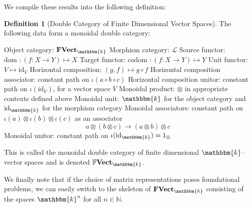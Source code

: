 \documentclass{amsart}
\newcommand{\N}{\mathbb{N}}
\newcommand{\C}{\mathbb{C}}
\newcommand{\K}{\mathbbm{k}}
\newcommand{\s}{\mathscr}
\newcommand{\tensor}{\otimes}
\renewcommand{\to}[1][]{\stackrel{#1}{\longrightarrow}}
\renewcommand{\mapsto}{\longmapsto}
\newcommand{\codom}{\text{codom }}
\newcommand{\dom}{\text{dom }}
\newcommand{\id}{\text{id}}
\newcommand{\FVect}{\textbf{FVect}}
\newcommand{\FFVect}{\mathbb{F}\textbf{Vect}}
\newcommand{\li}[1][]{\ifthenelse{\equal{#1}{}}{\item}{\item \label{#1}}}
\newenvironment{enmrt}{
  \enumerate[(i)]
  \setlength{\itemsep}{0pt}
}{
  \endenumerate
}
\numberwithin{thm}{section}
\theoremstyle{definition}
\newtheorem{defn}[thm]{Definition}
\begin{document}
We compile these results into the following definition:
\begin{defn}[Double Category of Finite Dimensional Vector Spaces]
The following data form a monoidal double category:
\begin{enmrt}
\li Object category: $\FVect_{\K}$
\li Morphism category: $\s{L}$
\li Source functor: $\dom : (f : X \to Y) \mapsto X$
\li Target functor: $\codom : (f : X \to Y) \mapsto Y$
\li Unit functor: $V \mapsto \id_V$
\li Horizontal composition: $(g, f) \mapsto g \circ f$
\li Horizontal composition associator: constant path on
$\iota(a \circ b \circ c)$
\li Horizontal composition unitor: constant path on $\iota(\id_V)$, for a vector
space $V$
\li Monoidal product: $\tensor$ in appropriate contexts defined above
\li Monoidal unit: $\K$ for the object category and $\id_{\K}$ for the morphism
category
\li Monoidal associators: constant path on
$\iota(a) \tensor \iota(b) \tensor \iota(c)$ as an associator
\[
  a \tensor (b \tensor c) \to (a \tensor b) \tensor c
\]
\li Monoidal unitor: constant path on $\iota(\id_{\K}) = 1_{\tensor}$
\end{enmrt}
This is called the monoidal double category of finite dimensional $\K$--vector
spaces and is denoted $\FFVect_{\K}$.
\end{defn}

We finally note that if the choice of matrix representations poses foundational
problems, we can easily switch to the skeleton of $\FVect_{\K}$ consisting of
the spaces $\K^n$ for all $n \in \N$.

%
%
%
\end{document}
